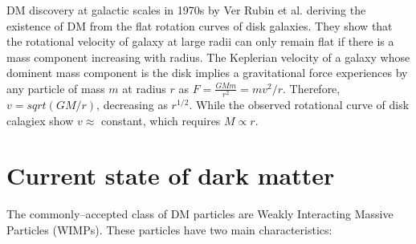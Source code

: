 \documentclass[paper=a4, fontsize=11pt]{scrartcl} %
\numberwithin{equation}{section} %
\numberwithin{figure}{section} %
\numberwithin{table}{section} %
\begin{document}
DM discovery at galactic scales in 1970s by Ver Rubin et al. deriving the existence of DM from the flat rotation curves of disk galaxies. They show that the rotational velocity of galaxy at large radii can only remain flat if there is a mass component increasing with radius. The Keplerian velocity of a galaxy whose dominent mass component is the disk implies a gravitational force experiences by any particle of mass $m$ at radius $r$ as $F = \frac{G M m}{r^2} = m v^2/r$. Therefore, $v = sqrt(GM/r)$, decreasing as $r^{1/2}$. While the observed rotational curve of disk calagiex show $v \approx$ constant, which requires $M \propto r$.


\section{Current state of dark matter}
The commonly--accepted class of DM particles are Weakly Interacting Massive Particles (WIMPs). These particles have two main characteristics:
\end{document}
